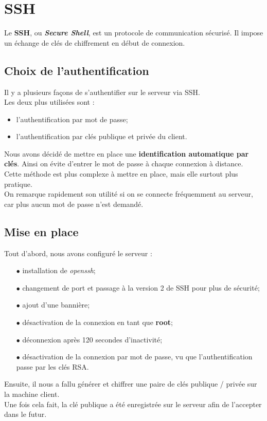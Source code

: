 \section{SSH}
\label{sec:ssh}

Le \textbf{SSH}, ou \textit{\textbf{Secure Shell}}, est un protocole de
communication sécurisé. Il impose un échange de clés de chiffrement en début de
connexion.


\subsection{Choix de l'authentification}
\label{subsec:choix-authentification}

Il y a plusieurs façons de s'authentifier sur le serveur via SSH. \\
Les deux plus utilisées sont :
\begin{itemize}
    \item l'authentification par mot de passe;
    \item l'authentification par clés publique et privée du client. \\
\end{itemize}

Nous avons décidé de mettre en place une \textbf{identification automatique par
clés}. Ainsi on évite d'entrer le mot de passe à chaque connexion à distance. \\
Cette méthode est plus complexe à mettre en place, mais elle surtout plus
pratique. \\

On remarque rapidement son utilité si on se connecte fréquemment au serveur, car
plus aucun mot de passe n'est demandé.


\subsection{Mise en place}
\label{subsec:mise-en-place}

Tout d'abord, nous avons configuré le serveur :
\begin{itemize}

    \item[$\bullet$] installation de \textit{openssh};
    \item[$\bullet$] changement de port et passage à la version 2 de SSH pour plus de
    sécurité;
    \item[$\bullet$] ajout d'une bannière;
    \item[$\bullet$] désactivation de la connexion en tant que \textbf{root};
    \item[$\bullet$] déconnexion après 120 secondes d'inactivité;
    \item[$\bullet$] désactivation de la connexion par mot de passe, vu que l'authentification
    passe par les clés RSA. \\

\end{itemize}

Ensuite, il nous a fallu générer et chiffrer une paire de clés publique /
privée sur la machine client. \\
Une fois cela fait, la clé publique a été enregistrée sur le serveur afin de
l'accepter dans le futur.
